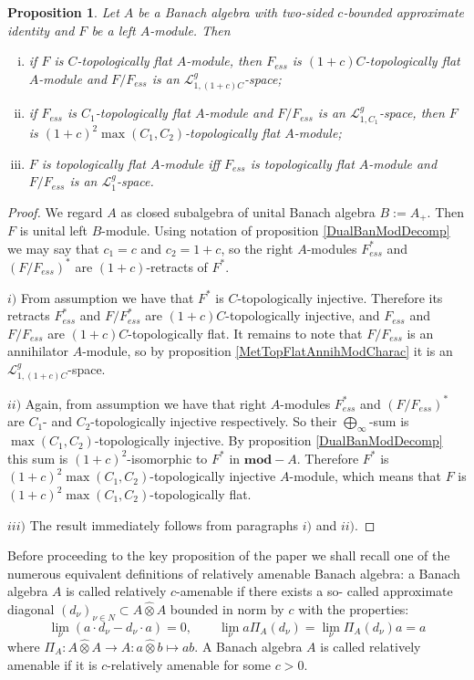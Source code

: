 \documentclass[12pt]{article}
\newtheorem{proposition}[theorem]{Proposition}
\newcommand{\projtens}{\mathbin{\widehat{\otimes}}}
\begin{document}
\begin{proposition}\label{TopFlatModCharac} Let $A$ be a Banach algebra with two-sided $c$-bounded approximate identity and $F$ be a left $A$-module. Then
\begin{enumerate}[i)]
\item if $F$ is $C$-topologically flat $A$-module, then $F_{ess}$ is $(1+c)C$-topologically flat $A$-module and $F/F_{ess}$ is an $\mathcal{L}_{1,(1+c)C}^g$-space;
\item if $F_{ess}$ is $C_1$-topologically flat $A$-module and $F/F_{ess}$ is an $\mathcal{L}_{1,C_1}^g$-space, then $F$ is $(1+c)^2\max(C_1, C_2)$-topologically flat $A$-module;
\item $F$ is topologically flat $A$-module iff $F_{ess}$  is topologically flat $A$-module and $F/F_{ess}$ is an $\mathcal{L}_1^g$-space.
\end{enumerate}
\end{proposition}
\begin{proof} We regard $A$ as closed subalgebra of unital Banach algebra $B:=A_+$. Then $F$ is unital left $B$-module. Using notation of proposition \ref{DualBanModDecomp} we may say that $c_1=c$ and $c_2=1+c$, so the right $A$-modules $F_{ess}^*$ and $(F/F_{ess})^*$ are $(1+c)$-retracts of $F^*$.

$i)$ From assumption we have that $F^*$ is $C$-topologically injective. Therefore its retracts $F_{ess}^*$ and $F/F_{ess}^*$ are $(1+c)C$-topologically injective, and $F_{ess}$ and $F/F_{ess}$ are $(1+c)C$-topologically flat. It remains to note that $F/F_{ess}$ is an annihilator $A$-module, so by proposition \ref{MetTopFlatAnnihModCharac} it is an $\mathcal{L}_{1,(1+c)C}^g$-space.

$ii)$ Again, from assumption we have that right $A$-modules $F_{ess}^*$ and $(F/F_{ess})^*$ are $C_1$- and $C_2$-topologically injective respectively. So their $\bigoplus_\infty$-sum is $\max(C_1,C_2)$-topologically injective. By proposition \ref{DualBanModDecomp} this sum is $(1+c)^2$-isomorphic to $F^*$ in $\mathbf{mod}-A$. Therefore $F^*$ is $(1+c)^2\max(C_1, C_2)$-topologically injective $A$-module, which means that $F$ is $(1+c)^2\max(C_1, C_2)$-topologically flat.

$iii)$ The result immediately follows from paragraphs $i)$ and $ii)$.
\end{proof}

Before proceeding to the key proposition of the paper we shall recall one of the numerous equivalent definitions of relatively amenable Banach algebra: a Banach algebra $A$ is called relatively $c$-amenable if there exists a so- called approximate diagonal $(d_\nu)_{\nu\in N}\subset A\projtens A$ bounded in norm by $c$ with the properties:
\[
\lim_\nu(a\cdot d_\nu-d_\nu\cdot a)=0,\qquad \lim_\nu a \Pi_A(d_\nu)=\lim_\nu\Pi_A(d_\nu)a=a
\]
where $\Pi_A:A\projtens A\to A:a\projtens b\mapsto ab$. A Banach algebra $A$ is called relatively amenable if it is $c$-relatively amenable for some $c>0$.
\end{document}
